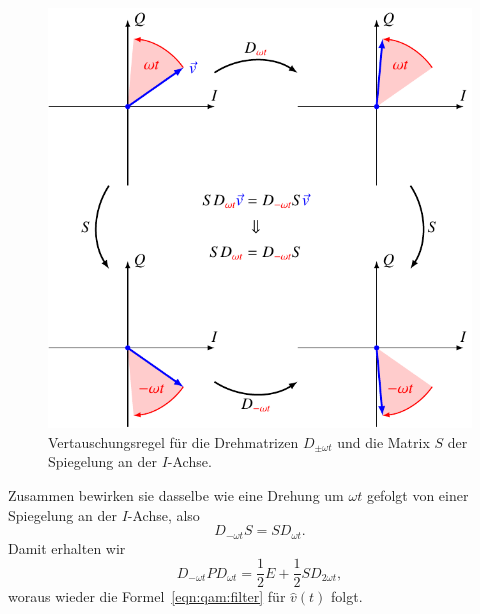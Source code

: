 \begin{figure}
\centering
\includegraphics{applications/qam/images/spiegelung.pdf}
\caption{Vertauschungsregel für die Drehmatrizen $D_{\pm\omega t}$ und
die Matrix $S$ der Spiegelung an der $I$-Achse.
\label{figure:qam:spiegelung}}
\end{figure}
Zusammen bewirken sie dasselbe wie eine Drehung um $\omega t$ gefolgt
von einer Spiegelung an der $I$-Achse, also
\[
D_{-\omega t}S=SD_{\omega t}.
\]
Damit erhalten wir
\[
D_{-\omega t}PD_{\omega t}
=
\frac12E + \frac12 SD_{2\omega t},
\]
woraus wieder die Formel~\eqref{eqn:qam:filter}
für $\hat{v}(t)$ folgt.

